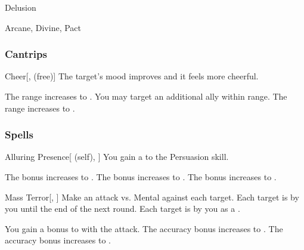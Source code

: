 \newpage
\begin{spellsection}{Delusion}

\begin{spellheader}
\end{spellheader}


 Arcane, Divine, Pact

\subsubsection{Cantrips}


\begin{freeability}{Cheer}[,  (free)]
The target's mood improves and it feels more cheerful.

\rankline
{} The range increases to \rngmed.
 You may target an additional ally within range.
 The range increases to \rnglong.
\end{freeability}

\end{spellsection}


\subsubsection{Spells}


\lowercase{\hypertarget{spell:Alluring Presence}{}}\label{spell:Alluring Presence}
\begin{attuneability}[Rank 1]{\hypertarget{spell:Alluring Presence}{Alluring Presence}}[ (self), ]
You gain a   to the Persuasion skill.

\rankline
{} The bonus increases to .
 The bonus increases to .
 The bonus increases to .
\end{attuneability}
\vspace{0.25em}



\lowercase{\hypertarget{spell:Mass Terror}{}}\label{spell:Mass Terror}
\begin{freeability}[Rank 1]{\hypertarget{spell:Mass Terror}{Mass Terror}}[, ]
Make an attack vs. Mental against each target.
\hit Each target is  by you until the end of the next round.
\crit Each target is  by you as a .

\rankline
{} You gain a  bonus to  with the attack.
 The accuracy bonus increases to .
 The accuracy bonus increases to .
\end{freeability}
\vspace{0.25em}



